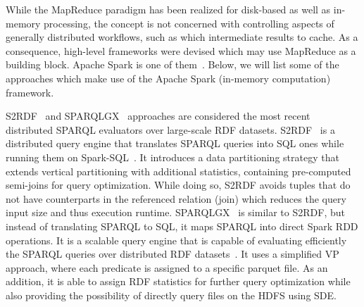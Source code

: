 While the MapReduce paradigm has been realized for disk-based as well as in-memory processing, the concept is not concerned with controlling aspects of generally distributed workflows, such as which intermediate results to cache. 
As a consequence, high-level frameworks were devised which may use MapReduce as a building block.
Apache Spark is one of them~\cite{zaharia2012resilient}.
Below, we will list some of the approaches which make use of the Apache Spark (in-memory computation) framework.

S2RDF~\cite{Schatzle:2016:SRQ:2977797.2977806} and SPARQLGX~\cite{sparqlgx-iswc-2016} approaches are considered the most recent distributed \gls{SPARQL} evaluators over large-scale \gls{RDF} datasets.
S2RDF~\cite{Schatzle:2016:SRQ:2977797.2977806} is a distributed query engine that translates \gls{SPARQL} queries into SQL ones while running them on Spark-SQL~\cite{Armbrust2015SSR}. 
It introduces a data partitioning strategy that extends vertical partitioning with additional statistics, containing pre-computed semi-joins for query optimization.
While doing so, S2RDF avoids tuples that do not have counterparts in the referenced relation (join) which reduces the query input size and thus execution runtime.
SPARQLGX~\cite{sparqlgx-iswc-2016} is similar to S2RDF, but instead of translating \gls{SPARQL} to SQL, it maps \gls{SPARQL} into direct Spark \gls{RDD} operations. 
It is a scalable query engine that is capable of evaluating efficiently the \gls{SPARQL} queries over distributed \gls{RDF} datasets~\cite{graux2018multi}.
It uses a simplified VP approach, where each predicate is assigned to a specific parquet file. 
As an addition, it is able to assign \gls{RDF} statistics for further query optimization while also providing the possibility of directly query files on the \gls{HDFS} using SDE.

